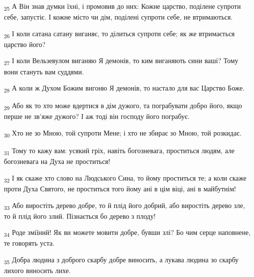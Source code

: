 \begin{tcolorbox}
\textsubscript{25} А Він знав думки їхні, і промовив до них: Кожне царство, поділене супроти себе, запустіє. І кожне місто чи дім, поділені супроти себе, не втримаються.
\end{tcolorbox}
\begin{tcolorbox}
\textsubscript{26} І коли сатана сатану виганяє, то ділиться супроти себе; як же втримається царство його?
\end{tcolorbox}
\begin{tcolorbox}
\textsubscript{27} І коли Вельзевулом виганяю Я демонів, то ким виганяють сини ваші? Тому вони стануть вам суддями.
\end{tcolorbox}
\begin{tcolorbox}
\textsubscript{28} А коли ж Духом Божим вигоню Я демонів, то настало для вас Царство Боже.
\end{tcolorbox}
\begin{tcolorbox}
\textsubscript{29} Або як то хто може вдертися в дім дужого, та пограбувати добро його, якщо перше не зв'яже дужого? І аж тоді він господу його пограбує.
\end{tcolorbox}
\begin{tcolorbox}
\textsubscript{30} Хто не зо Мною, той супроти Мене; і хто не збирає зо Мною, той розкидає.
\end{tcolorbox}
\begin{tcolorbox}
\textsubscript{31} Тому то кажу вам: усякий гріх, навіть богозневага, проститься людям, але богозневага на Духа не проститься!
\end{tcolorbox}
\begin{tcolorbox}
\textsubscript{32} І як скаже хто слово на Людського Сина, то йому проститься те; а коли скаже проти Духа Святого, не проститься того йому ані в цім віці, ані в майбутнім!
\end{tcolorbox}
\begin{tcolorbox}
\textsubscript{33} Або виростіть дерево добре, то й плід його добрий, або виростіть дерево зле, то й плід його злий. Пізнається бо дерево з плоду!
\end{tcolorbox}
\begin{tcolorbox}
\textsubscript{34} Роде зміїний! Як ви можете мовити добре, бувши злі? Бо чим серце наповнене, те говорять уста.
\end{tcolorbox}
\begin{tcolorbox}
\textsubscript{35} Добра людина з доброго скарбу добре виносить, а лукава людина зо скарбу лихого виносить лихе.
\end{tcolorbox}
